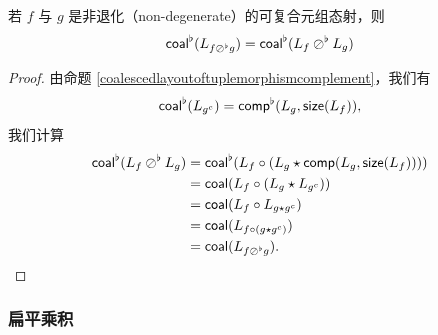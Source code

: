 


\begin{proposition}
    若 $f$ 与 $g$ 是非退化（non-degenerate）的可复合元组态射，则
    \[
    \mathsf{coal}^\flat(L_{f \oslash^\flat g}) = \mathsf{coal}^\flat(L_f \oslash^\flat L_g)
    \]
\end{proposition}

\begin{proof}
由命题 \ref{coalescedlayoutoftuplemorphismcomplement}，我们有
\[
\mathsf{coal}^\flat(L_{g^c}) = \mathsf{comp}^\flat(L_g,\mathsf{size}(L_f)),
\]
我们计算
    \begin{align*}
    \mathsf{coal}^\flat(L_f \oslash^\flat L_g) & = \mathsf{coal}^\flat(L_f \circ \left(L_g \star \mathsf{comp}(L_g,\mathsf{size}(L_f))\right))\\
    & = \mathsf{coal}(L_f \circ \left( L_{g} \star L_{g^c} \right))\\
    & = \mathsf{coal}(L_f \circ L_{g\star g^c})\\
    & = \mathsf{coal}(L_{f \circ (g \star g^c)})\\
    & = \mathsf{coal}(L_{f \oslash^\flat g}).
    \end{align*}
\end{proof}

\subsubsection{扁平乘积}
\label{subsubsection.flatproduct}

